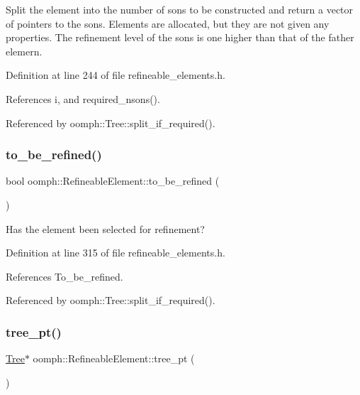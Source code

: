 Split the element into the number of sons to be constructed and return a vector of pointers to the sons. Elements are allocated, but they are not given any properties. The refinement level of the sons is one higher than that of the father elemern. 



Definition at line 244 of file refineable\+\_\+elements.\+h.



References i, and required\+\_\+nsons().



Referenced by oomph\+::\+Tree\+::split\+\_\+if\+\_\+required().

\mbox{\label{classoomph_1_1RefineableElement_ab5929530b4b5e5be7b2e52e4668c43fd}} 
\subsubsection{\texorpdfstring{to\+\_\+be\+\_\+refined()}{to\_be\_refined()}}
{\footnotesize\ttfamily bool oomph\+::\+Refineable\+Element\+::to\+\_\+be\+\_\+refined (\begin{DoxyParamCaption}{ }\end{DoxyParamCaption})\hspace{0.3cm}{\ttfamily [inline]}}



Has the element been selected for refinement? 



Definition at line 315 of file refineable\+\_\+elements.\+h.



References To\+\_\+be\+\_\+refined.



Referenced by oomph\+::\+Tree\+::split\+\_\+if\+\_\+required().

\mbox{\label{classoomph_1_1RefineableElement_a17201434f10a993b2ac5ba2bccd9c2b7}} 
\subsubsection{\texorpdfstring{tree\+\_\+pt()}{tree\_pt()}}
{\footnotesize\ttfamily \hyperlink{classoomph_1_1Tree}{Tree}$\ast$ oomph\+::\+Refineable\+Element\+::tree\+\_\+pt (\begin{DoxyParamCaption}{ }\end{DoxyParamCaption})\hspace{0.3cm}{\ttfamily [inline]}}




